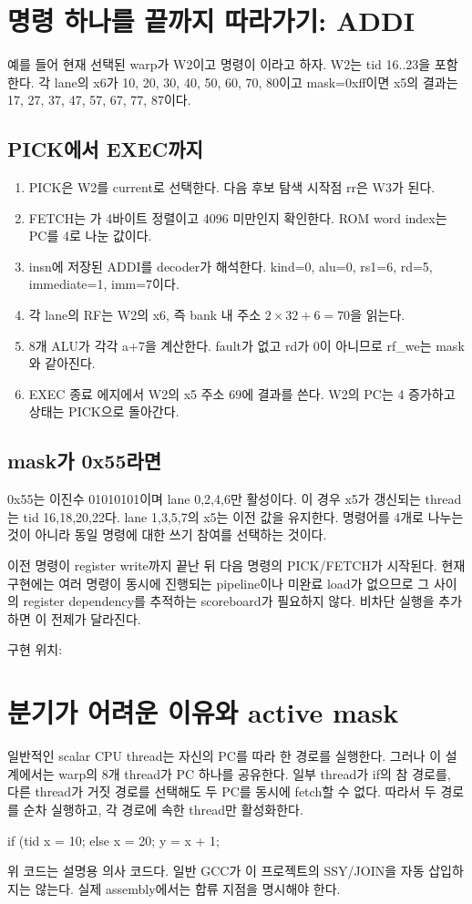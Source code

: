 \documentclass[a4paper,11pt]{article}
\newcommand{\code}[1]{\texttt{\detokenize{#1}}}
\newcommand{\chapterpage}[1]{\clearpage\section{#1}}
\newcommand{\source}[1]{\par{\small\color{teal}구현 위치: \urlstyle{same}\path{#1}}\par}
\begin{document}
\chapterpage{명령 하나를 끝까지 따라가기: ADDI}
예를 들어 현재 선택된 warp가 W2이고 명령이 \code{addi x5,x6,7}이라고 하자. W2는 tid 16..23을 포함한다. 각 lane의 x6가 10, 20, 30, 40, 50, 60, 70, 80이고 mask=0xff이면 x5의 결과는 17, 27, 37, 47, 57, 67, 77, 87이다.
\subsection{PICK에서 EXEC까지}
\begin{enumerate}
\item PICK은 W2를 current로 선택한다. 다음 후보 탐색 시작점 rr은 W3가 된다.
\item FETCH는 \code{pc[2]}가 4바이트 정렬이고 4096 미만인지 확인한다. ROM word index는 PC를 4로 나눈 값이다.
\item insn에 저장된 ADDI를 decoder가 해석한다. kind=0, alu=0, rs1=6, rd=5, immediate=1, imm=7이다.
\item 각 lane의 RF는 W2의 x6, 즉 bank 내 주소 $2\times32+6=70$을 읽는다.
\item 8개 ALU가 각각 a+7을 계산한다. fault가 없고 rd가 0이 아니므로 rf\_we는 mask와 같아진다.
\item EXEC 종료 에지에서 W2의 x5 주소 69에 결과를 쓴다. W2의 PC는 4 증가하고 상태는 PICK으로 돌아간다.
\end{enumerate}
\subsection{mask가 0x55라면}
0x55는 이진수 01010101이며 lane 0,2,4,6만 활성이다. 이 경우 x5가 갱신되는 thread는 tid 16,18,20,22다. lane 1,3,5,7의 x5는 이전 값을 유지한다. 명령어를 4개로 나누는 것이 아니라 동일 명령에 대한 쓰기 참여를 선택하는 것이다.
\begin{keybox}
이전 명령이 register write까지 끝난 뒤 다음 명령의 PICK/FETCH가 시작된다. 현재 구현에는 여러 명령이 동시에 진행되는 pipeline이나 미완료 load가 없으므로 그 사이의 register dependency를 추적하는 scoreboard가 필요하지 않다. 비차단 실행을 추가하면 이 전제가 달라진다.
\end{keybox}
\source{rtl/simt_sm.sv}

\chapterpage{분기가 어려운 이유와 active mask}
일반적인 scalar CPU thread는 자신의 PC를 따라 한 경로를 실행한다. 그러나 이 설계에서는 warp의 8개 thread가 PC 하나를 공유한다. 일부 thread가 if의 참 경로를, 다른 thread가 거짓 경로를 선택해도 두 PC를 동시에 fetch할 수 없다. 따라서 두 경로를 순차 실행하고, 각 경로에 속한 thread만 활성화한다.
\begin{Code}
if (tid %
    x = 10;
else
    x = 20;
y = x + 1;
\end{Code}
위 코드는 설명용 의사 코드다. 일반 GCC가 이 프로젝트의 SSY/JOIN을 자동 삽입하지는 않는다. 실제 assembly에서는 합류 지점을 명시해야 한다.
\end{document}
